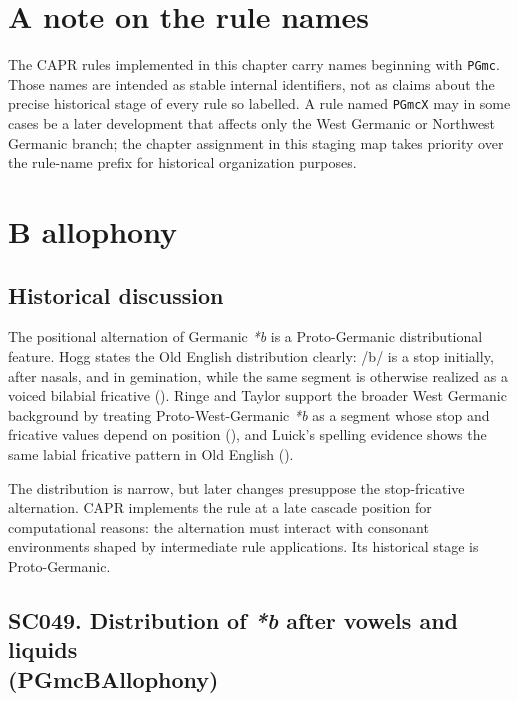 \documentclass[
  british,
  a4paper,
  openany]{book}
\providecommand{\texorpdfstring}[2]{#1}
\DeclareRobustCommand{\CAPRRuleHeading}[2]{%
  #1\texorpdfstring{\\(#2)}{ (#2)}%
}
\begin{document}
\section{A note on the rule names}\label{a-note-on-the-rule-names}

The CAPR rules implemented in this chapter carry names beginning with
\texttt{PGmc}. Those names are intended as stable internal identifiers,
not as claims about the precise historical stage of every rule so
labelled. A rule named \texttt{PGmcX} may in some cases be a later
development that affects only the West Germanic or Northwest Germanic
branch; the chapter assignment in this staging map takes priority over
the rule-name prefix for historical organization purposes.

\section{B allophony}\label{b-allophony}

\subsection{Historical discussion}\label{historical-discussion}

The positional alternation of Germanic \emph{*b} is a Proto-Germanic
distributional feature. Hogg states the Old English distribution
clearly: /b/ is a stop initially, after nasals, and in gemination, while
the same segment is otherwise realized as a voiced bilabial fricative
(). Ringe and Taylor support
the broader West Germanic background by treating Proto-West-Germanic
\emph{*b} as a segment whose stop and fricative values depend on
position (),
and Luick's spelling evidence shows the same labial fricative pattern in
Old English ().

The distribution is narrow, but later changes presuppose the
stop-fricative alternation. CAPR implements the rule at a late cascade
position for computational reasons: the alternation must interact with
consonant environments shaped by intermediate rule applications. Its
historical stage is Proto-Germanic.

\subsection{\texorpdfstring{\CAPRRuleHeading{SC049. Distribution of \emph{*b} after vowels and liquids}{PGmcBAllophony}}{}}\label{rule-PGmcBAllophony}
\end{document}
